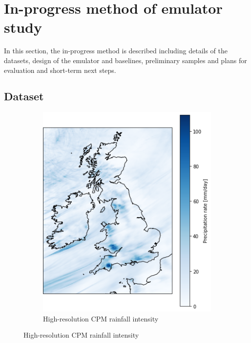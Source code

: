 \section{In-progress method of emulator study} \label{sec:emulatorstudy}

In this section, the in-progress method is described including details of the datasets, design of the emulator and baselines, preliminary samples and plans for evaluation and short-term next steps.

\subsection{Dataset} \label{sec:emulatorstudy:datasets}

\begin{figure}[hp]
    \begin{subfigure}{0.45\textwidth}
        \includegraphics[width=1.0\linewidth]{../figures/modelling/cpm-uk-pr-1981-01-26.png}
        \caption{High-resolution CPM rainfall intensity}
        \label{fig:modelling:cpm-snapshot}
    \end{subfigure}
    \hspace{1em}

\end{figure}
